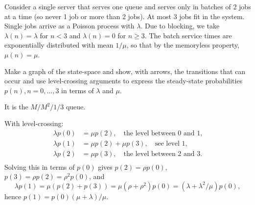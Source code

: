 \begin{exercise}\label{ex:67}
Consider
a single server that serves one queue and serves only in batches of 2 jobs at a time (so never 1 job or more than 2 jobs).  At most 3 jobs fit in the system.
 Single jobs arrive as a Poisson process with $\lambda$.
Due to blocking, we take $\lambda(n) = \lambda$ for $n<3$ and $\lambda(n)=0$ for $n\geq 3$. 
The batch service times are exponentially distributed with mean $1/\mu$, so that  by the memoryless property, $\mu(n) = \mu$.

Make a graph of the state-space and show, with arrows, the transitions that can occur and  use level-crossing arguments to express the steady-state probabilities $p(n), n=0,\ldots, 3$ in terms of $\lambda$ and $\mu$.
\begin{solution}
It is the $M/M^2/1/3$ queue.


With level-crossing:
 \begin{align*}
 \lambda p(0) &= \mu p(2), \quad\text{the level between 0 and 1,}\\
 \lambda p(1) &= \mu p(2) +\mu p(3), \quad\text{see level 1,}\\
 \lambda p(2) &= \mu p(3), \quad\text{the level between 2 and 3.}\\
 \end{align*}
 Solving this in terms of $p(0)$ gives $p(2) = \rho p(0)$, $p(3) = \rho p(2) = \rho^2p(0)$, and
 \begin{equation*}
 \lambda p(1) = \mu(p(2) + p(3)) = \mu (\rho + \rho^2) p(0) = (\lambda + \lambda^2/\mu) p(0),
 \end{equation*}
hence $p(1) = p(0)(\mu + \lambda)/\mu$. 
\end{solution}
\end{exercise}

